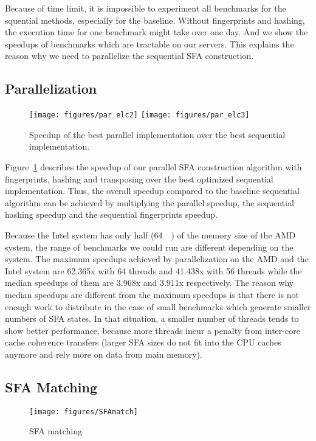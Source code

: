 \documentclass[10pt, conference, compsocconf]{IEEEtran}
\begin{document}
Because of time limit, it is impossible to experiment all benchmarks for the squential
methods, especially for the baseline.
Without fingerprints and hashing, the execution time for one benchmark might take over one day.
And we show the speedups of benchmarks which are tractable on our servers.
This explains the reason why we need to parallelize the sequential SFA construction.


\subsection{Parallelization}
\label{sec:parallel}
\begin{figure}[htp]
    \centering
    \vspace{-1mm}
    {
        \texttt{[image: figures/par\_elc2]}
    }\hfill
    {
        \texttt{[image: figures/par\_elc3]}
    }
    \caption{Speedup of the best parallel implementation
             over the best sequential implementation.}
    \label{fig:parExp}
    \vskip-0mm
\end{figure}
Figure~\ref{fig:parExp} describes the speedup of our parallel SFA construction algorithm 
with fingerprints, hashing and transposing over the best optimized sequential implementation. 
Thus, the overall speedup compared to the baseline sequential algorithm can be achieved by
multiplying the parallel speedup, the sequential hashing speedup and the sequential fingerprints
speedup. 

Because the Intel system has only half (\SI{64}{\giga\byte})
of the memory size of the AMD
system, the range of benchmarks we could run are different depending on the
system.  The maximum speedups achieved by parallelization on the AMD and the
Intel
system are 62.365x with 64 threads and 41.438x with 56 threads while the
median speedups of them are 3.968x and 3.911x respectively. The reason why
median speedups are different from the maximum speedups is that there is not
enough work to distribute in the case of small benchmarks which generate
smaller numbers of SFA states. In that situation, a smaller number of threads
tends to show better performance, because more threads incur a penalty from
inter-core cache coherence transfers (larger SFA sizes do not fit into
the CPU caches anymore and rely more on data from main memory).


\subsection{SFA Matching}
\label{sec:sfaMatching}
\begin{figure}[htp]
    \centering
    \vspace{-1mm}
    \texttt{[image: figures/SFAmatch]}
    \caption{SFA matching}
    \label{fig:SFAMatch}
    \vskip-0mm
\end{figure}
\end{document}
